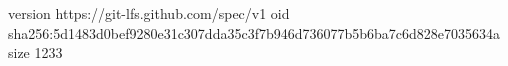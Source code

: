 version https://git-lfs.github.com/spec/v1
oid sha256:5d1483d0bef9280e31c307dda35c3f7b946d736077b5b6ba7c6d828e7035634a
size 1233
